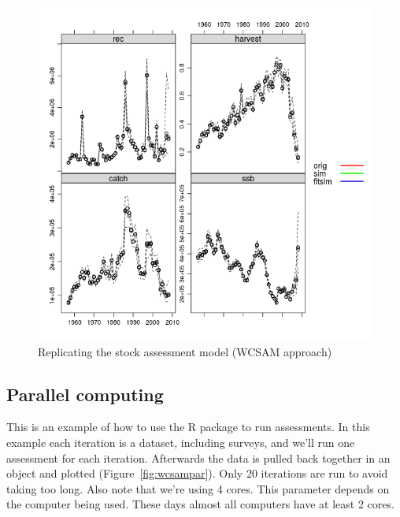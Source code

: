 \documentclass[a4paper,english,10pt]{article}\usepackage[]{graphicx}\usepackage[]{color}
\makeatletter
\def\maxwidth{ %
  \ifdim\Gin@nat@width>\linewidth
    \linewidth
  \else
    \Gin@nat@width
  \fi
}
\newenvironment{knitrout}{}{} %
\makeatother
\begin{document}
\begin{knitrout}
\color{fgcolor}\begin{figure}[H]

{\centering \includegraphics[width=\maxwidth]{figure/wcsam-1} 

}

\caption[Replicating the stock assessment model (WCSAM approach)]{Replicating the stock assessment model (WCSAM approach)}\label{fig:wcsam}
\end{figure}


\end{knitrout}

\subsection{Parallel computing}

This is an example of how to use the  R package to run assessments. In this example each iteration is a dataset, including surveys, and we'll run one assessment for each iteration. Afterwards the data is pulled back together in an  object and plotted (Figure~\ref{fig:wcsampar}). Only 20 iterations are run to avoid taking too long. Also note that we're using 4 cores. This parameter depends on the computer being used. These days almost all computers have at least 2 cores.
\end{document}
